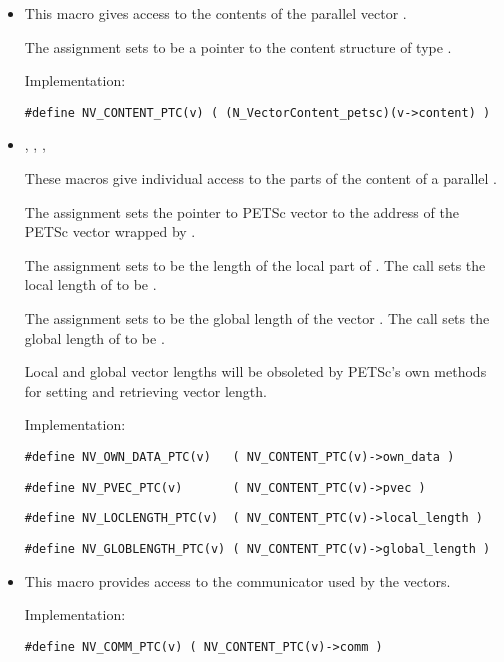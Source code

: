 \begin{itemize}

\item 

  This macro gives access to the contents of the parallel
  vector .
  
  The assignment  sets       
   to be a pointer to the  content    
  structure of type .
  
  Implementation:
  
  \verb|#define NV_CONTENT_PTC(v) ( (N_VectorContent_petsc)(v->content) )|
  
\item 
  , , 
  , 
  
  These macros give individual access to the parts of    
  the content of a parallel .                        
  
  The assignment  sets the pointer to PETSc vector 
   to the address of the PETSc vector wrapped by  . 
  
  The assignment  sets  to be     
  the length of the local part of . 
  The call  sets      
  the local length of  to be .
  
  The assignment  sets  to  
  be the global length of the vector .                    
  The call  sets the global       
  length of  to be .
  
  {\warn}Local and global vector lengths will be obsoleted by PETSc's own methods 
  for setting and retrieving vector length. 
  
  Implementation:
  
  \verb|#define NV_OWN_DATA_PTC(v)   ( NV_CONTENT_PTC(v)->own_data )|

  \verb|#define NV_PVEC_PTC(v)       ( NV_CONTENT_PTC(v)->pvec )|

  \verb|#define NV_LOCLENGTH_PTC(v)  ( NV_CONTENT_PTC(v)->local_length )|

  \verb|#define NV_GLOBLENGTH_PTC(v) ( NV_CONTENT_PTC(v)->global_length )|
  
\item {}

  This macro provides access to the {\mpi} communicator used by the {\nvecpetsc}
  vectors.

  Implementation:

  \verb|#define NV_COMM_PTC(v) ( NV_CONTENT_PTC(v)->comm )|

\end{itemize}
